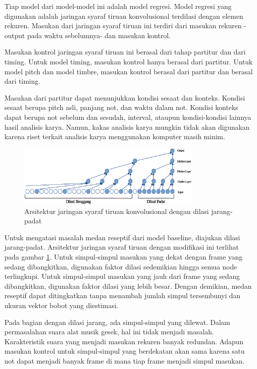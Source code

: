 Tiap model dari model-model ini adalah model regresi. Model regresi yang digunakan adalah jaringan syaraf tiruan konvolusional terdilasi dengan elemen rekuren. Masukan dari jaringan syaraf tiruan ini terdiri dari masukan rekuren -output pada waktu sebelumnya- dan masukan kontrol.

Masukan kontrol jaringan syaraf tiruan ini berasal dari tahap partitur dan dari timing. Untuk model timing, masukan kontrol hanya berasal dari partitur. Untuk model pitch dan model timbre, masukan kontrol berasal dari partitur dan berasal dari timing.

Masukan dari partitur dapat menunjukkan kondisi sesaat dan konteks. Kondisi sesaat berupa pitch asli, panjang not, dan waktu dalam not. Kondisi konteks dapat berupa not sebelum dan sesudah, interval, ataupun kondisi-kondisi lainnya hasil analisis karya. Namun, kakas analisis karya mungkin tidak akan digunakan karena riset terkait analisis karya menggunakan komputer masih minim.

\begin{figure}[h]
    \centering
    \includegraphics[width=0.8\textwidth]{resources/sparse-dense-dilated-cnn.eps}
    \caption{Arsitektur jaringan syaraf tiruan konvolusional dengan dilasi jarang-padat}\label{fig-sparsedilated-cnn}
\end{figure}

Untuk mengatasi masalah medan reseptif dari model baseline, diajukan dilasi jarang-padat. Arsitektur jaringan syaraf tiruan dengan modifikasi ini terlihat pada gambar \ref{fig-sparsedilated-cnn}. Untuk simpul-simpul masukan yang dekat dengan frame yang sedang dibangkitkan, digunakan faktor dilasi sedemikian hingga semua node terlingkupi. Untuk simpul-simpul masukan yang jauh dari frame yang sedang dibangkitkan, digunakan faktor dilasi yang lebih besar. Dengan demikian, medan reseptif dapat ditingkatkan tanpa menambah jumlah simpul tersembunyi dan ukuran vektor bobot yang diestimasi.

Pada bagian dengan dilasi jarang, ada simpul-simpul yang dilewat. Dalam permasalahan suara alat musik gesek, hal ini tidak menjadi masalah. Karakteristik suara yang menjadi masukan rekuren banyak redundan. Adapun masukan kontrol untuk simpul-simpul yang berdekatan akan sama karena satu not dapat menjadi banyak frame di mana tiap frame menjadi simpul masukan.

